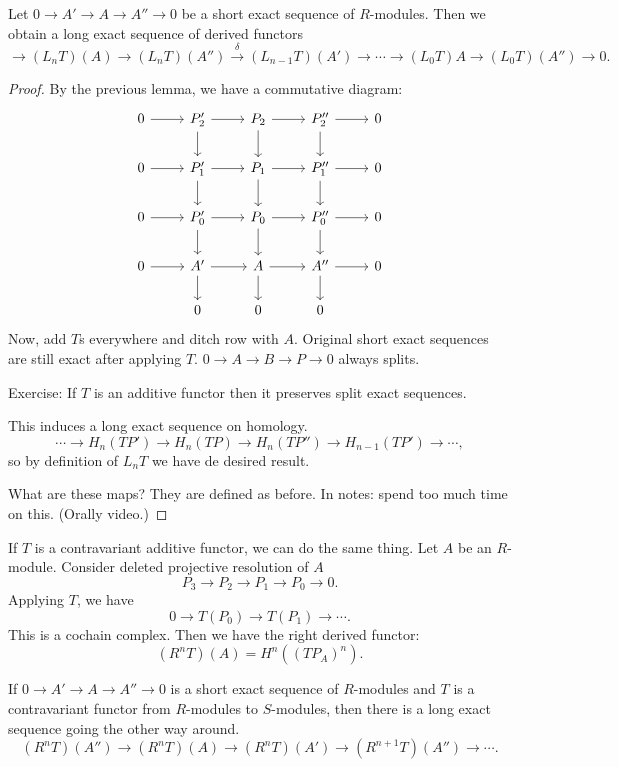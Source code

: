 \begin{theorem}[2.6]
    Let $0 \to  A' \to  A \to A'' \to  0$ be a short exact sequence of $R$-modules.
    Then we obtain a long exact sequence of derived functors
    \[
        \to  (L_n T)(A) \to  (L_nT)(A'') \xrightarrow{\delta}   (L_{n-1}T)(A') \to  \cdots \to  (L_0T)A \to  (L_0 T)(A'') \to  0
    .\] 
\end{theorem}
\begin{proof}
    By the previous lemma, we have a commutative diagram:
    \[
        \begin{tikzcd}
            0\arrow[r, ""]& P_2' \arrow[r, ""] \arrow[d, ""]& P_2 \arrow[r, ""] \arrow[d, ""]& P_2'' \arrow[d, ""] \arrow[r, ""]& 0\\
            0\arrow[r, ""]& P_1' \arrow[r, ""] \arrow[d, ""]& P_1 \arrow[r, ""] \arrow[d, ""]& P_1'' \arrow[d, ""] \arrow[r, ""]& 0\\
0\arrow[r, ""]            & P_0' \arrow[r, ""] \arrow[d, ""]& P_0 \arrow[r, ""] \arrow[d, ""]& P_0'' \arrow[d, ""] \arrow[r, ""]& 0\\
0\arrow[r, ""]            & A' \arrow[r, ""] \arrow[d, ""]& A \arrow[r, ""] \arrow[d, ""]& A'' \arrow[d, ""] \arrow[r, ""]& 0\\
                          & 0 & 0 & 0 &
        \end{tikzcd}
    \]
    Now, add $T$s everywhere and ditch row with $A$.
    Original short exact sequences are still exact after applying $T$.
    $0 \to  A \to  B \to  P \to  0$ always splits.
    \begin{uovt}
    Exercise: If $T$ is an additive functor then it preserves split exact sequences.
    \end{uovt}
    This induces a long exact sequence on homology.
    \[
        \cdots \to  H_n(TP') \to  H_n(TP) \to  H_n(TP'') \to  H_{n-1}(TP') \to  \cdots
    ,\] 
    so by definition of $L_nT$ we have de desired result.

    What are these maps? They are defined as before. In notes: spend too much time on this. (Orally video.)
\end{proof}

\begin{remark}
    If $T$ is a contravariant additive functor, we can do the same thing.
    Let $A$ be an $R$-module. Consider deleted projective resolution of $A$
    \[
    P_3 \to  P_2 \to  P_1 \to  P_0 \to  0
    .\] 
    Applying $T$, we have
    \[
        0 \to  T(P_0) \to  T(P_1) \to  \cdots
    .\] 
    This is a cochain complex.
    Then we have the right derived functor:
    \[
        (R^{n} T)(A) = H^{n}((TP_A)^{n})
    .\] 

If $0 \to  A' \to  A \to  A'' \to  0$ is a short exact sequence of $R$-modules and $T$ is a contravariant functor from $R$-modules to $S$-modules, then there is a long exact sequence going the other way around.
\[
    (R^{n} T)(A'') \to (R^{n}T)(A) \to  (R^{n}T)(A') \to (R^{n+1}T)(A'') \to  \cdots
.\] 
\end{remark}

